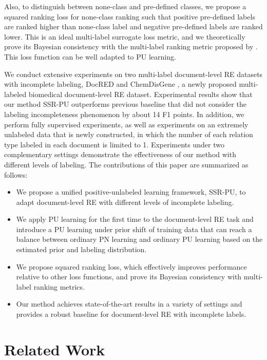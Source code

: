 \documentclass[11pt]{article}
\begin{document}
Also, to distinguish between none-class and pre-defined classes, we propose a squared ranking loss for none-class ranking such that positive pre-defined labels are ranked higher than none-class label and negative pre-defined labels are ranked lower. This is an ideal multi-label surrogate loss metric, and we theoretically prove its Bayesian consistency with the multi-label ranking metric proposed by \citep{ijcai2022p630}. This loss function can be well adapted to PU learning.

We conduct extensive experiments on two multi-label document-level RE datasets with incomplete labeling, DocRED \citep{yao-etal-2019-docred} and ChemDisGene \citep{zhang-etal-2022-distant}, a newly proposed multi-labeled biomedical document-level RE dataset. Experimental results show that our method SSR-PU outperforms previous baseline that did not consider the labeling incompleteness phenomenon by about 14 F1 points. In addition, we perform fully supervised experiments, as well as experiments on an extremely unlabeled data that is newly constructed, in which the number of each relation type labeled in each document is limited to 1. Experiments under two complementary settings demonstrate the effectiveness of our method with different levels of labeling. The contributions of this paper are summarized as follows: 
\begin{itemize}
\item We propose a unified positive-unlabeled learning framework, SSR-PU, to adapt document-level RE with different levels of incomplete labeling.
\item We apply PU learning for the first time to the document-level RE task and introduce a PU learning under prior shift of training data that can reach a balance between ordinary PN learning and ordinary PU learning based on the estimated prior and labeling distribution.
\item We propose squared ranking loss, which effectively improves performance relative to other loss functions, and prove its Bayesian consistency with multi-label ranking metrics.
\item Our method achieves state-of-the-art results in a variety of settings and provides a robust baseline for document-level RE with incomplete labels.
\end{itemize}

\section{Related Work}
\end{document}
